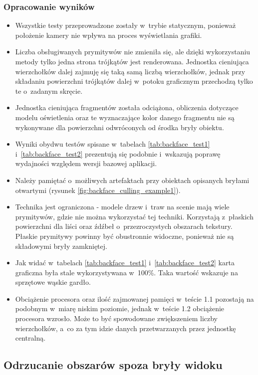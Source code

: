 \documentclass[a4paper,twoside,12pt]{book}
\begin{document}
\subsubsection{Opracowanie wyników}
\begin{itemize}
    \item Wszystkie testy przeprowadzone zostały w~trybie statycznym, ponieważ położenie kamery nie wpływa na proces wyświetlania grafiki.
    \item Liczba obsługiwanych prymitywów nie zmieniła się, ale dzięki wykorzystaniu metody tylko jedna strona trójkątów jest renderowana. Jednostka cieniująca wierzchołków dalej zajmuję się taką samą liczbą wierzchołków, jednak przy składaniu powierzchni trójkątów dalej w~potoku graficznym przechodzą tylko te o~zadanym skręcie.
    \item Jednostka cieniująca fragmentów została odciążona, obliczenia dotyczące modelu oświetlenia oraz te wyznaczające kolor danego fragmentu nie są wykonywane dla powierzchni odwróconych od środka bryły obiektu.
    \item Wyniki obydwu testów spisane w~tabelach \ref{tab:backface_test1} i~\ref{tab:backface_test2} prezentują się podobnie i~wskazują poprawę wydajności względem wersji bazowej aplikacji.
    \item Należy pamiętać o~możliwych artefaktach przy obiektach opisanych bryłami otwartymi (rysunek \ref{fig:backface_culling_example1}).
    \item Technika jest ograniczona - modele drzew i~traw na scenie mają wiele prymitywów, gdzie nie można wykorzystać tej techniki. Korzystają z~płaskich powierzchni dla liści oraz źdźbeł o~przezroczystych obszarach tekstury. Płaskie prymitywy powinny być obustronnie widoczne, ponieważ nie są składowymi bryły zamkniętej.
    \item Jak widać w~tabelach  \ref{tab:backface_test1} i~\ref{tab:backface_test2} karta graficzna była stale wykorzystywana w~100\%. Taka wartość wskazuje na sprzętowe wąskie gardło.
    \item Obciążenie procesora oraz ilość zajmowanej pamięci w~teście 1.1 pozostają na podobnym w~miarę niskim poziomie, jednak w~teście 1.2 obciążenie procesora wzrosło. Może to być spowodowane zwiększeniem liczby wierzchołków, a~co za tym idzie danych przetwarzanych przez jednostkę centralną.
\end{itemize}

\subsection{Odrzucanie obszarów spoza bryły widoku}
\end{document}
